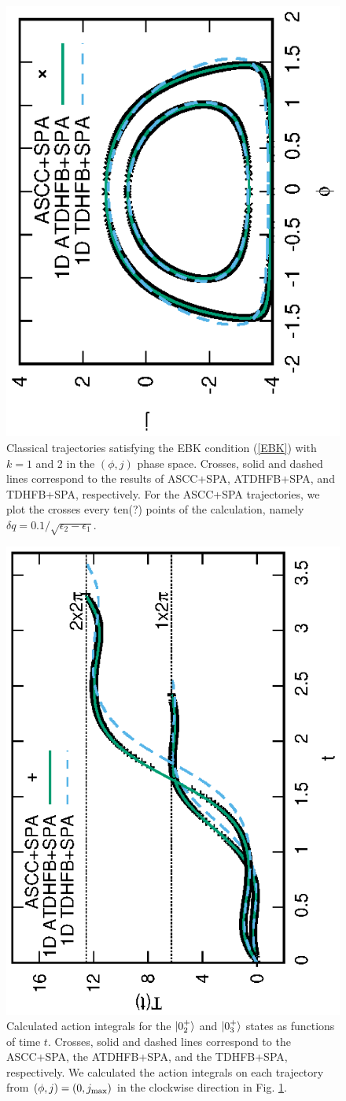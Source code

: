 \documentclass[%
superscriptaddress,
showpacs,
nofootinbib,
amsmath,amssymb,
aps,
prc,
twocolumn,
floatfix ]%
{revtex4-1}
\begin{document}
\begin{figure}[thb]
 \begin{center}
   \includegraphics[height=0.45\textwidth,angle=-90]{N16X3p2trajectory.eps}
 \end{center}
\caption{Classical trajectories satisfying the EBK condition
(\ref{EBK}) with $k=1$ and 2 in the $(\phi,j)$ phase space.
Crosses, solid and dashed lines correspond to the results
of ASCC+SPA, ATDHFB+SPA, and TDHFB+SPA, respectively. 
For the ASCC+SPA trajectories, we plot the crosses
every ten(?) points of the calculation,
namely $\delta q=0.1/\sqrt{\epsilon_2-\epsilon_1}$.
}
\label{fig:N16_traj}
\end{figure}
\begin{figure}[thb]
 \begin{center}
   \includegraphics[height=0.5\textwidth,angle=-90]{N16X3p2action.eps}
 \end{center}
\caption{Calculated action integrals for the $\ket{0_2^+}$ and $\ket{0_3^+}$ states as functions of time $t$.
Crosses, solid and dashed lines correspond to the ASCC+SPA,
the ATDHFB+SPA, and the TDHFB+SPA, respectively. 
We calculated the action integrals on each trajectory
from $(\phi,j)=(0,j_{\rm max})$ in the clockwise direction
in Fig. \ref{fig:N16_traj}.
}
\label{fig:N16_tau}
\end{figure}
\end{document}
